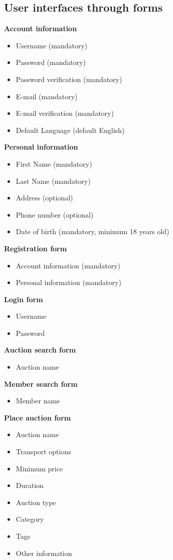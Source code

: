 	\subsection{User interfaces through forms}
	\textbf{Account information}
		\begin{itemize}
			\item Username (mandatory)
			\item Password (mandatory)
			\item Password verification (mandatory)
			\item E-mail (mandatory)
			\item E-mail verification (mandatory)
			\item Default Language (default English)
		\end{itemize}
	\textbf{Personal information}
		\begin{itemize}
			\item First Name (mandatory)
			\item Last Name (mandatory)
			\item Address (optional)
			\item Phone number (optional)
			\item Date of birth (mandatory, minimum 18 years old)
		\end{itemize}
	\textbf{Registration form}
		\begin{itemize}
			\item Account information (mandatory)
			\item Personal information (mandatory)
		\end{itemize}
	\textbf{Login form}
		\begin{itemize}
			\item Username
			\item Password
		\end{itemize}
	\textbf{Auction search form}
		\begin{itemize}
			\item Auction name
		\end{itemize}
	\textbf{Member search form}
		\begin{itemize}
			\item Member name
		\end{itemize}
	\textbf{Place auction form}
		\begin{itemize}
			\item Auction name
			\item Transport options
			\item Minimum price
			\item Duration
			\item Auction type
			\item Category
			\item Tags
			\item Other information
		\end{itemize}

